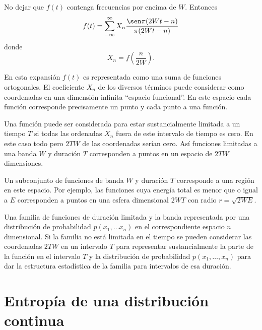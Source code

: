 \begin{theorem}
  No dejar que $f(t)$ contenga frecuencias por encima de $W$. Entonces
  \begin{equation}
    f(t) = \sum_{-\infty}^{\infty} X_n \frac{\sen \pi(2Wt-n)}{\pi(2Wt-n)}
  \end{equation}
  donde
  \begin{equation}
    X_n = f\left(\frac{n}{2W} \right).
  \end{equation}
\end{theorem}

En esta expansi\'on $f(t)$ es representada como una suma de funciones
ortogonales. El coeficiente $X_n$ de los diversos t\'erminos puede
considerar como coordenadas en una dimensi\'on infinita ``espacio
funcional''. En este espacio cada funci\'on corresponde precisamente
un punto y cada punto a una funci\'on.

Una funci\'on puede ser considerada para estar sustancialmente
limitada a un tiempo $T$ si todas las ordenadas $X_n$ fuera de este
intervalo de tiempo es cero. En este caso todo pero $2TW$ de las
coordenadas ser\'ian cero. As\'i funciones limitadas a una banda $W$ y
duraci\'on $T$ corresponden a puntos en un espacio de $2TW$
dimensiones.

Un subconjunto de funciones de banda $W$ y duraci\'on $T$ corresponde
a una regi\'on en este espacio. Por ejemplo, las funciones cuya
energ\'ia total es menor que o igual a $E$ corresponden a puntos en
una esfera dimensional $2WT$ con radio $r=\sqrt{2WE}$.

Una familia de funciones de duraci\'on limitada y la banda
representada por una distribuci\'on de probabilidad $p(x_1, \ldots
x_n)$ en el correspondiente espacio $n$ dimensional. Si la familia no
est\'a limitada en el tiempo se pueden considerar las coordenadas
$2TW$ en un intervalo $T$ para representar sustancialmente la parte de
la funci\'on en el intervalo $T$ y la distribuci\'on de probabilidad
$p(x_1, \ldots, x_n)$ para dar la estructura estad\'istica de la familia
para intervalos de esa duraci\'on.

\clearpage

\chapter{Entrop\'ia de una distribuci\'on continua}
\label{sec:20}

